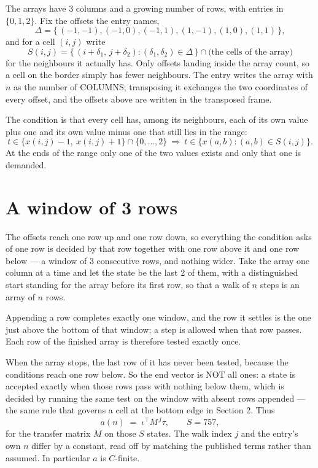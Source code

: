 \documentclass[11pt,a4paper]{article}
\theoremstyle{plain}
\theoremstyle{definition}
\begin{document}
The arrays have $3$ columns and a growing number of rows, with entries in $\{0,1,2\}$. Fix the
offsets the entry names,
\[
\Delta=\{\,(-1,-1), (-1,0), (-1,1), (1,-1), (1,0), (1,1)\,\},
\]
and for a cell $(i,j)$ write
\[
S(i,j)=\{\,(i+\delta_1,\,j+\delta_2) : (\delta_1,\delta_2)\in\Delta\,\}\cap
\text{(the cells of the array)}
\]
for the neighbours it actually has. Only offsets landing inside the array count, so a cell on
the border simply has fewer neighbours. The entry writes the array with $n$ as the number of COLUMNS; transposing it exchanges the two coordinates of every offset, and the offsets above are written in the transposed frame.

The condition is that every cell has, among its neighbours, each of its own value plus one and its own value minus one that still lies in the range:
\[
t\in\{x(i,j)-1,\ x(i,j)+1\}\cap\{0,\dots,2\}\ \Longrightarrow\ t\in\{x(a,b):(a,b)\in S(i,j)\}.
\]
At the ends of the range only one of the two values exists and only that one is demanded.

\section{A window of 3 rows}

The offsets reach one row up and one row down, so everything the condition asks of one row is
decided by that row together with one row above it and one row below --- a window of
$3$ consecutive rows, and nothing wider. Take the array one column at a time and
let the state be the last 2 of them, with a distinguished start standing for the array before its
first row, so that a walk of $n$ steps is an array of $n$ rows.

Appending a row completes exactly one window, and the row it settles is the one just above the bottom of that window; a step is
allowed when that row passes. Each row of the finished array is therefore tested exactly once.

When the array stops, the last row of it has never been tested, because the
conditions reach one row below. So the end vector is NOT all ones: a state is accepted exactly when
those rows pass with nothing below them, which is decided by running the same test on the window
with absent rows appended --- the same rule that governs a cell at the bottom edge in
Section 2.
Thus
\[
a(n)\;=\;\iota^{\!\top}M^{\,j}\tau ,\qquad S=757,
\]
for the transfer matrix $M$ on those $S$ states. The walk index $j$ and the entry's own $n$
differ by a constant, read off by matching the published terms rather than assumed. In
particular $a$ is $C$-finite.
\end{document}
